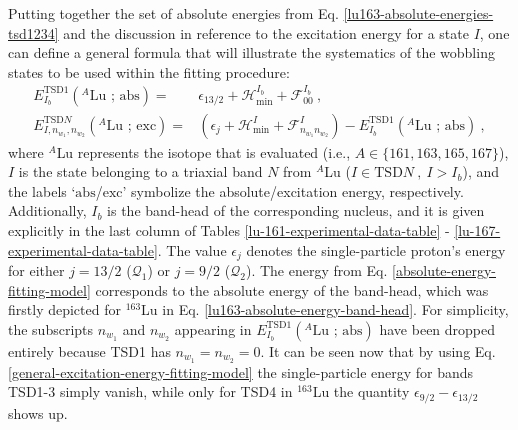 Putting together the set of absolute energies from Eq. \ref{lu163-absolute-energies-tsd1234} and the discussion in reference to the excitation energy for a state $I$, one can define a general formula that will illustrate the systematics of the wobbling states to be used within the fitting procedure:
\begin{align}
    E_{I_b}^\text{TSD1}(^A\text{Lu\ ;\ abs})=&\epsilon_{13/2}+\mathcal{H}_\text{min}^{I_b}+\mathcal{F}_{00}^{I_b}\ ,\label{absolute-energy-fitting-model}\\
    E_{I,n_{w_1},n_{w_2}}^{\text{TSD}N}(^A\text{Lu\ ;\ exc})=&\left(\epsilon_{j}+\mathcal{H}_\text{min}^I+\mathcal{F}^I_{n_{w_1}n_{w_2}}\right)-E_{I_b}^\text{TSD1}(^A\text{Lu\ ;\ abs})\ ,
    \label{general-excitation-energy-fitting-model}
\end{align}
where $^A$Lu represents the isotope that is evaluated (i.e., $A\in\{161,163,165,167\}$), $I$ is the state belonging to a triaxial band $N$ from $^A$Lu ($I\in\text{TSD}N\ ,\ I>I_b$), and the labels `$\text{abs}$/$\text{exc}$' symbolize the absolute/excitation energy, respectively. Additionally, $I_b$ is the band-head of the corresponding nucleus, and it is given explicitly in the last column of Tables \ref{lu-161-experimental-data-table} - \ref{lu-167-experimental-data-table}. The value $\epsilon_j$ denotes the single-particle proton's energy for either $j=13/2$ ($\mathcal{Q}_1$) or $j=9/2$ ($\mathcal{Q}_2$). The energy from Eq. \ref{absolute-energy-fitting-model} corresponds to the absolute energy of the band-head, which was firstly depicted for $^{163}$Lu in Eq. \ref{lu163-absolute-energy-band-head}. For simplicity, the subscripts $n_{w_1}$ and $n_{w_2}$ appearing in $E_{I_b}^\text{TSD1}(^A\text{Lu\ ;\ abs})$ have been dropped entirely because TSD1 has $n_{w_1}=n_{w_2}=0$. It can be seen now that by using Eq. \ref{general-excitation-energy-fitting-model} the single-particle energy for bands TSD1-3 simply vanish, while only for TSD4 in $^{163}$Lu the quantity $\epsilon_{9/2}-\epsilon_{13/2}$ shows up.


